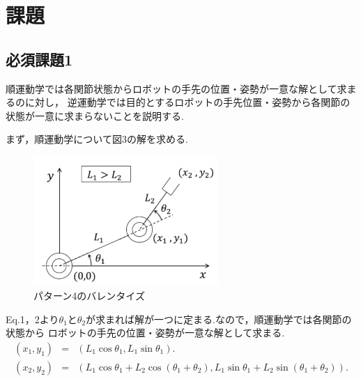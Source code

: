 \documentclass[10pt,a4j]{jsarticle}
\begin{document}
\section{課題}

  \subsection{必須課題1}
    順運動学では各関節状態からロボットの手先の位置・姿勢が一意な解として求まるのに対し，
    逆運動学では目的とするロボットの手先位置・姿勢から各関節の状態が一意に求まらないことを説明する.
    \par まず，順運動学について図3の解を求める.
      \begin{figure}[H]
        \centering
        \includegraphics[width=7cm]{../img/ziyuudo2_robo_arm.png}
        \caption{パターン4のバレンタイズ}
      \end{figure}
    Eq.1，2より$\theta_{1}$と$\theta_{2}$が求まれば解が一つに定まる.なので，順運動学では各関節の状態から
    ロボットの手先の位置・姿勢が一意な解として求まる.
      \begin{eqnarray}
        (x_{1}, y_{1}) &=& (L_{1}\cos\theta_{1}, L_{1}\sin\theta_{1}). \\
        (x_{2}, y_{2}) &=& (L_{1}\cos\theta_{1} + L_{2}\cos{(\theta_{1} + \theta_{2})}, L_{1}\sin\theta_{1} + L_{2}\sin{(\theta_{1} + \theta_{2})}).
      \end{eqnarray}
\end{document}
